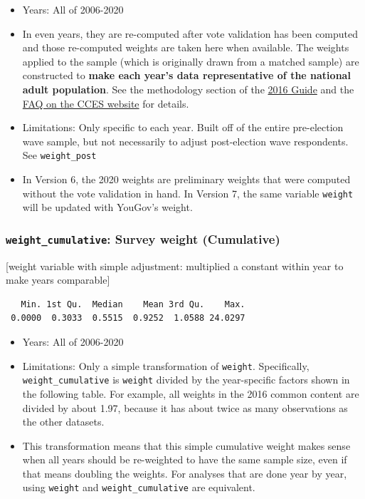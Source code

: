 \documentclass[10pt,article,oneside]{memoir}
\theoremstyle{definition}
\begin{document}
\begin{itemize}
\tightlist
\item
  Years: All of 2006-2020
\item
  In even years, they are re-computed after vote validation has been
  computed and those re-computed weights are taken here when available.
  The weights applied to the sample (which is originally drawn from a
  matched sample) are constructed to \textbf{make each year's data
  representative of the national adult population}. See the methodology
  section of the
  \href{https://dataverse.harvard.edu/api/access/datafile/3047286}{2016
  Guide} and the
  \href{https://cces.gov.harvard.edu/frequently-asked-questions}{FAQ on
  the CCES website} for details.
\item
  Limitations: Only specific to each year. Built off of the entire
  pre-election wave sample, but not necessarily to adjust post-election
  wave respondents. See \texttt{weight\_post}
\item
  In Version 6, the 2020 weights are preliminary weights that were
  computed without the vote validation in hand. In Version 7, the same
  variable \texttt{weight} will be updated with YouGov's weight.
\end{itemize}

\hypertarget{weight_cumulative-survey-weight-cumulative}{%
\subsubsection{\texorpdfstring{\texttt{weight\_cumulative}: Survey
weight
(Cumulative)}{weight\_cumulative: Survey weight (Cumulative)}}\label{weight_cumulative-survey-weight-cumulative}}

{[}weight variable with simple adjustment: multiplied a constant within
year to make years comparable{]}

\begin{verbatim}
   Min. 1st Qu.  Median    Mean 3rd Qu.    Max. 
 0.0000  0.3033  0.5515  0.9252  1.0588 24.0297 
\end{verbatim}

\begin{itemize}
\tightlist
\item
  Years: All of 2006-2020
\item
  Limitations: Only a simple transformation of \texttt{weight}.
  Specifically, \texttt{weight\_cumulative} is \texttt{weight} divided
  by the year-specific factors shown in the following table. For
  example, all weights in the 2016 common content are divided by about
  1.97, because it has about twice as many observations as the other
  datasets.
\item
  This transformation means that this simple cumulative weight makes
  sense when all years should be re-weighted to have the same sample
  size, even if that means doubling the weights. For analyses that are
  done year by year, using \texttt{weight} and
  \texttt{weight\_cumulative} are equivalent.
\end{itemize}
\end{document}
